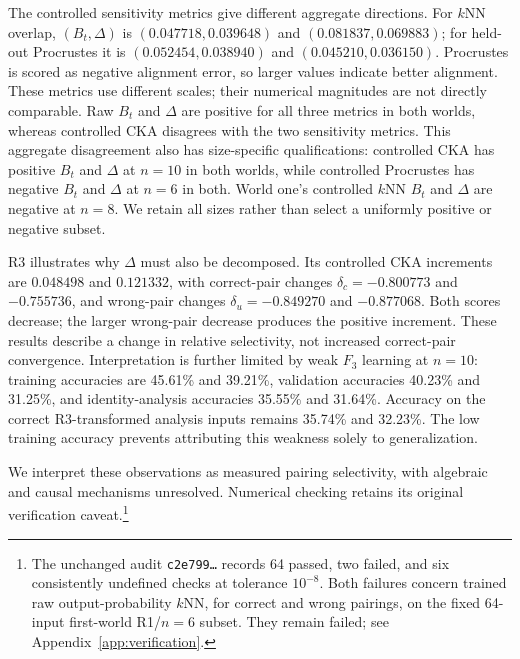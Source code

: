 The controlled sensitivity metrics give different aggregate directions. For $k$NN overlap, $(B_t,\Delta)$ is $(0.047718,0.039648)$ and $(0.081837,0.069883)$; for held-out Procrustes it is $(0.052454,0.038940)$ and $(0.045210,0.036150)$. Procrustes is scored as negative alignment error, so larger values indicate better alignment. These metrics use different scales; their numerical magnitudes are not directly comparable. Raw $B_t$ and $\Delta$ are positive for all three metrics in both worlds, whereas controlled CKA disagrees with the two sensitivity metrics. This aggregate disagreement also has size-specific qualifications: controlled CKA has positive $B_t$ and $\Delta$ at $n=10$ in both worlds, while controlled Procrustes has negative $B_t$ and $\Delta$ at $n=6$ in both. World one's controlled $k$NN $B_t$ and $\Delta$ are negative at $n=8$. We retain all sizes rather than select a uniformly positive or negative subset.

R3 illustrates why $\Delta$ must also be decomposed. Its controlled CKA increments are $0.048498$ and $0.121332$, with correct-pair changes $\delta_c=-0.800773$ and $-0.755736$, and wrong-pair changes $\delta_u=-0.849270$ and $-0.877068$. Both scores decrease; the larger wrong-pair decrease produces the positive increment. These results describe a change in relative selectivity, not increased correct-pair convergence. Interpretation is further limited by weak $F_3$ learning at $n=10$: training accuracies are 45.61\% and 39.21\%, validation accuracies 40.23\% and 31.25\%, and identity-analysis accuracies 35.55\% and 31.64\%. Accuracy on the correct R3-transformed analysis inputs remains 35.74\% and 32.23\%. The low training accuracy prevents attributing this weakness solely to generalization.

We interpret these observations as measured pairing selectivity, with algebraic and causal mechanisms unresolved. Numerical checking retains its original verification caveat.\footnote{The unchanged audit \texttt{c2e799\ldots} records 64 passed, two failed, and six consistently undefined checks at tolerance $10^{-8}$. Both failures concern trained raw output-probability $k$NN, for correct and wrong pairings, on the fixed 64-input first-world R1/$n=6$ subset. They remain failed; see Appendix~\ref{app:verification}.}
